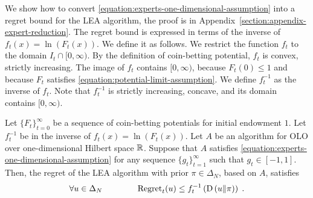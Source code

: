 We show how to convert \eqref{equation:experts-one-dimensional-assumption} into
a regret bound for the LEA algorithm, the proof is in
Appendix~\ref{section:appendix-expert-reduction}. The regret bound is expressed
in terms of the inverse of $f_t(x) = \ln(F_t(x))$. We define it as follows. We
restrict the function $f_t$ to the domain $I_t \cap [0, \infty)$. By the
definition of coin-betting potential, $f_t$ is convex, strictly increasing. The
image of $f_t$ contains $[0,\infty)$, because $F_t(0) \le 1$ and because $F_t$
satisfies \eqref{equation:potential-limit-assumption}. We define $f_t^{-1}$ as
the inverse of $f_t$. Note that $f_t^{-1}$ is strictly increasing, concave, and
its domain contains $[0, \infty)$.

\begin{theorem}
\label{theorem:regret-bound-experts}
Let $\{F_t\}_{t=0}^\infty$ be a sequence of coin-betting potentials for initial
endowment $1$. Let $f_t^{-1}$ be in the inverse of $f_t(x) = \ln(F_t(x))$.
Let $A$ be an algorithm for OLO over one-dimensional Hilbert space
$\mathbb{R}$. Suppose that $A$ satisfies
\eqref{equation:experts-one-dimensional-assumption} for any sequence
$\{g_t\}_{t=1}^\infty$ such that $g_t \in [-1,1]$. Then, the regret of the
LEA algorithm with prior $\pi \in \Delta_N$, based on $A$, satisfies
\[
\forall u \in \Delta_N \qquad \qquad
\operatorname{Regret}_t(u) \le f_t^{-1}\left( \operatorname*{D}\left({u}\middle\|{\pi}\right) \right) \; .
\]
\end{theorem}

